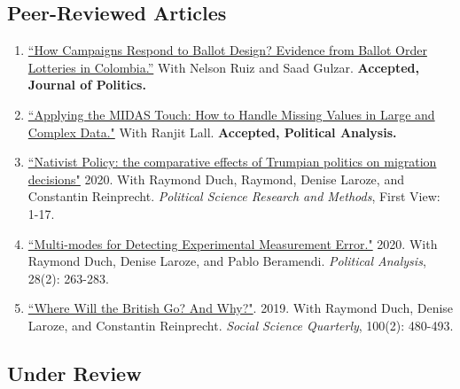 \documentclass[11pt, a4paper]{article}
\begin{document}
 \subsection*{Peer-Reviewed Articles}

 \begin{enumerate}

 \item \href{https://ts-robinson.com/publication/gulzar-how-campaigns-respond-2020/gulzar-how-campaigns-respond-2020.pdf}{``How Campaigns Respond to Ballot Design? Evidence from Ballot Order Lotteries in Colombia.''} With Nelson Ruiz and Saad Gulzar. \textbf{Accepted, Journal of Politics.}

 \item \href{https://doi.org/10.33774/apsa-2020-3tk40-v3}{``Applying the MIDAS Touch: How to Handle Missing Values in Large and Complex Data."} With Ranjit Lall. \textbf{Accepted, Political Analysis.}

 \item \href{https://doi.org/10.1017/psrm.2020.33}{``Nativist Policy: the comparative effects of Trumpian politics on migration decisions"} 2020. With Raymond Duch, Raymond, Denise Laroze, and Constantin Reinprecht. \textit{Political Science Research and Methods}, First View: 1-17.

 \item \href{https://www.cambridge.org/core/journals/political-analysis/article/multimodes-for-detecting-experimental-measurement-error/37514FC46CF29C7B345DB9881E252150/share/7b059037b0da9182a33316d7f87b2de81b619592}{``Multi-modes for Detecting Experimental Measurement Error."} 2020. With Raymond Duch, Denise Laroze, and Pablo Beramendi. \textit{Political Analysis}, 28(2): 263-283.

 \item \href{https://doi.org/10.1111/ssqu.12584}{``Where Will the British Go? And Why?"}. 2019. With Raymond Duch, Denise Laroze, and Constantin Reinprecht. \textit{Social Science Quarterly}, 100(2): 480-493. 

\end{enumerate}


\subsection*{Under Review}
\end{document}
